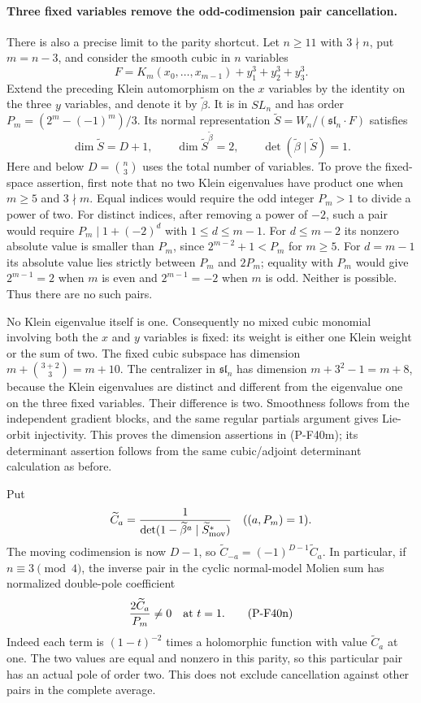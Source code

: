 \documentclass[11pt,a4paper]{article}
\begin{document}
\paragraph{Three fixed variables remove the odd-codimension pair cancellation.}
There is also a precise limit to the parity shortcut. Let
$n\ge11$ with $3\nmid n$, put $m=n-3$, and consider the smooth
cubic in $n$ variables
\[
             F=K_m(x_0,\ldots,x_{m-1})+y_1^3+y_2^3+y_3^3.
 \tag{P-F40l}
\]
Extend the preceding Klein automorphism on the $x$ variables by
the identity on the three $y$ variables, and denote it by
$\widetilde\beta$. It is in $SL_n$ and has order
$P_m=(2^m-(-1)^m)/3$. Its normal representation
$\widetilde S=W_n/(\mathfrak{sl}_n\cdot F)$ satisfies
\[
 \dim\widetilde S=D+1,\qquad
 \dim\widetilde S^{\widetilde\beta}=2,
 \qquad \det(\widetilde\beta\mid\widetilde S)=1.
 \tag{P-F40m}
\]
Here and below $D=\binom n3$ uses the total number of variables.
To prove the fixed-space assertion, first note that no two
Klein eigenvalues have product one when $m\ge5$ and $3\nmid m$.
Equal indices would require the odd integer $P_m>1$ to divide
a power of two. For distinct indices, after removing a power
of $-2$, such a pair would require
$P_m\mid1+(-2)^d$ with $1\le d\le m-1$.
For $d\le m-2$ its nonzero absolute value is smaller than
$P_m$, since $2^{m-2}+1<P_m$ for $m\ge5$.
For $d=m-1$ its absolute value lies strictly between
$P_m$ and $2P_m$; equality with $P_m$ would give
$2^{m-1}=2$ when $m$ is even and $2^{m-1}=-2$ when $m$
is odd. Neither is possible. Thus there are no such pairs.

No Klein eigenvalue itself is one. Consequently no mixed
cubic monomial involving both the $x$ and $y$ variables is
fixed: its weight is either one Klein weight or the sum of
two. The fixed cubic subspace has dimension
$m+\binom{3+2}{3}=m+10$.
The centralizer in $\mathfrak{sl}_n$ has dimension
$m+3^2-1=m+8$, because the Klein eigenvalues are distinct
and different from the eigenvalue one on the three fixed
variables. Their difference is two. Smoothness follows
from the independent gradient blocks, and the same regular
partials argument gives Lie-orbit injectivity. This proves
the dimension assertions in (P-F40m); its determinant
assertion follows from the same cubic/adjoint determinant
calculation as before.

Put
\[
 \widetilde C_a=
 \frac1{\det(1-\widetilde\beta^a\mid
                         \widetilde S^*_{\rm mov})}
                \quad((a,P_m)=1).
\]
The moving codimension is now $D-1$, so
$\widetilde C_{-a}=(-1)^{D-1}\widetilde C_a$.
In particular, if $n\equiv3\pmod4$, the inverse pair in the
cyclic normal-model Molien sum has normalized double-pole
coefficient
\[
                    \frac{2\widetilde C_a}{P_m}\ne0
                    \quad\hbox{at }t=1.
 \tag{P-F40n}
\]
Indeed each term is $(1-t)^{-2}$ times a holomorphic function
with value $\widetilde C_a$ at one. The two values are equal
and nonzero in this parity, so this particular pair has an
actual pole of order two. This does not exclude cancellation
against other pairs in the complete average.
\end{document}
